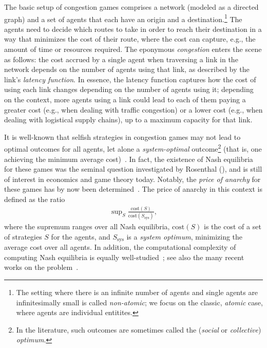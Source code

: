 \documentclass[letterpaper]{article} %
\begin{document}
The basic setup of congestion games comprises a network (modeled as a directed graph) and a set of agents that each have an origin and a destination.\footnote{The setting where there is an infinite number of agents and single agents are infinitesimally small is called \emph{non-atomic}; we focus on the classic, \emph{atomic} case, where agents are individual entitites.}
The agents need to decide which routes to take in order to reach their destination in a way that minimizes the cost of their route, where the cost can capture, e.g., the amount of time or resources required.
The eponymous \emph{congestion} enters the scene as follows: the cost accrued by a single agent when traversing a link in the network depends on the number of agents using that link, as described by the link's \emph{latency function}. In essence, the latency function captures how the cost of using each link changes depending on the number of agents using it; depending on the context, more agents using a link could lead to each of them paying a greater cost (e.g., when dealing with traffic congestion) or a lower cost (e.g., when dealing with logistical supply chains), up to a maximum capacity for that link.

It is well-known that selfish strategies in congestion games may not lead to optimal outcomes for all agents,
let alone a \emph{system-optimal} outcome\footnote{In the literature, such outcomes are sometimes called the (\emph{social} or \emph{collective}) \emph{optimum}.} (that is, one achieving the minimum average cost)~\cite{SharonARBS18}.
In fact, the existence of Nash equilibria for these games was the seminal question investigated by Rosenthal  (\citeyear{Rosenthal73}), and is still of interest in economics and game theory today.
Notably, the \emph{price of anarchy} for these games has by now been determined~\cite{ChristodoulouK05,AwerbuchAE05}. The price of anarchy in this context is defined as the ratio
\begin{align} \label{eq:poa}
\tag{PoA}
\sup\nolimits_{S } \frac{\mathrm{cost}(S)}{\mathrm{cost}(S_{\mathrm{sys}})},
\end{align}
where the supremum ranges over all Nash equilibria, $\mathrm{cost}(S)$ is the cost of a set of strategies $S$ for the agents, and $S_{\mathrm{sys}}$ is a \emph{system optimum}, minimizing the average cost over all agents.
In addition, the computational complexity of computing Nash equilibria is equally well-studied~\cite{AckermannRV06,FabrikantPT04}; see also the many recent works on the problem~\cite{HarksHKMS22,0040XPRT22}.
\end{document}
